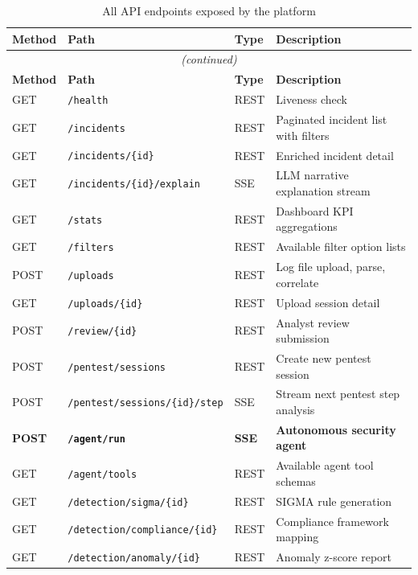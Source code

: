 \documentclass[12pt,a4paper]{article}
\begin{document}
\begin{longtable}{lllp{5.5cm}}
\caption{All API endpoints exposed by the platform}\\
\toprule
\textbf{Method} & \textbf{Path} & \textbf{Type} & \textbf{Description} \\
\midrule
\endfirsthead
\multicolumn{4}{c}{\small\itshape (continued)} \\
\toprule
\textbf{Method} & \textbf{Path} & \textbf{Type} & \textbf{Description} \\
\midrule
\endhead
\bottomrule
\endfoot
GET  & \texttt{/health}                   & REST & Liveness check \\
GET  & \texttt{/incidents}                & REST & Paginated incident list with filters \\
GET  & \texttt{/incidents/\{id\}}         & REST & Enriched incident detail \\
GET  & \texttt{/incidents/\{id\}/explain} & SSE  & LLM narrative explanation stream \\
GET  & \texttt{/stats}                    & REST & Dashboard KPI aggregations \\
GET  & \texttt{/filters}                  & REST & Available filter option lists \\
POST & \texttt{/uploads}                  & REST & Log file upload, parse, correlate \\
GET  & \texttt{/uploads/\{id\}}           & REST & Upload session detail \\
POST & \texttt{/review/\{id\}}            & REST & Analyst review submission \\
POST & \texttt{/pentest/sessions}         & REST & Create new pentest session \\
POST & \texttt{/pentest/sessions/\{id\}/step} & SSE & Stream next pentest step analysis \\
\textbf{POST} & \texttt{\textbf{/agent/run}}  & \textbf{SSE} & \textbf{Autonomous security agent} \\
GET  & \texttt{/agent/tools}              & REST & Available agent tool schemas \\
GET  & \texttt{/detection/sigma/\{id\}}   & REST & SIGMA rule generation \\
GET  & \texttt{/detection/compliance/\{id\}} & REST & Compliance framework mapping \\
GET  & \texttt{/detection/anomaly/\{id\}} & REST & Anomaly z-score report \\
\end{longtable}
\end{document}
